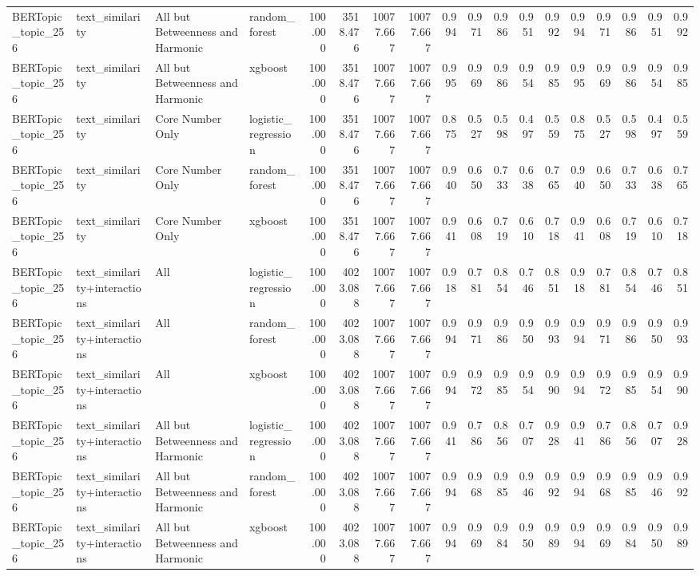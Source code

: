 \begin{tabular}{llllrrrrrrrrrrrrrr}
BERTopic_topic_256 & text_similarity & All but Betweenness and Harmonic & random_forest & 100.000 & 3518.476 & 10077.667 & 10077.667 & 0.994 & 0.971 & 0.986 & 0.951 & 0.992 & 0.994 & 0.971 & 0.986 & 0.951 & 0.992 \\
BERTopic_topic_256 & text_similarity & All but Betweenness and Harmonic & xgboost & 100.000 & 3518.476 & 10077.667 & 10077.667 & 0.995 & 0.969 & 0.986 & 0.954 & 0.985 & 0.995 & 0.969 & 0.986 & 0.954 & 0.985 \\
BERTopic_topic_256 & text_similarity & Core Number Only & logistic_regression & 100.000 & 3518.476 & 10077.667 & 10077.667 & 0.875 & 0.527 & 0.598 & 0.497 & 0.559 & 0.875 & 0.527 & 0.598 & 0.497 & 0.559 \\
BERTopic_topic_256 & text_similarity & Core Number Only & random_forest & 100.000 & 3518.476 & 10077.667 & 10077.667 & 0.940 & 0.650 & 0.733 & 0.638 & 0.765 & 0.940 & 0.650 & 0.733 & 0.638 & 0.765 \\
BERTopic_topic_256 & text_similarity & Core Number Only & xgboost & 100.000 & 3518.476 & 10077.667 & 10077.667 & 0.941 & 0.608 & 0.719 & 0.610 & 0.718 & 0.941 & 0.608 & 0.719 & 0.610 & 0.718 \\
BERTopic_topic_256 & text_similarity+interactions & All & logistic_regression & 100.000 & 4023.088 & 10077.667 & 10077.667 & 0.918 & 0.781 & 0.854 & 0.746 & 0.851 & 0.918 & 0.781 & 0.854 & 0.746 & 0.851 \\
BERTopic_topic_256 & text_similarity+interactions & All & random_forest & 100.000 & 4023.088 & 10077.667 & 10077.667 & 0.994 & 0.971 & 0.986 & 0.950 & 0.993 & 0.994 & 0.971 & 0.986 & 0.950 & 0.993 \\
BERTopic_topic_256 & text_similarity+interactions & All & xgboost & 100.000 & 4023.088 & 10077.667 & 10077.667 & 0.994 & 0.972 & 0.985 & 0.954 & 0.990 & 0.994 & 0.972 & 0.985 & 0.954 & 0.990 \\
BERTopic_topic_256 & text_similarity+interactions & All but Betweenness and Harmonic & logistic_regression & 100.000 & 4023.088 & 10077.667 & 10077.667 & 0.941 & 0.786 & 0.856 & 0.707 & 0.928 & 0.941 & 0.786 & 0.856 & 0.707 & 0.928 \\
BERTopic_topic_256 & text_similarity+interactions & All but Betweenness and Harmonic & random_forest & 100.000 & 4023.088 & 10077.667 & 10077.667 & 0.994 & 0.968 & 0.985 & 0.946 & 0.992 & 0.994 & 0.968 & 0.985 & 0.946 & 0.992 \\
BERTopic_topic_256 & text_similarity+interactions & All but Betweenness and Harmonic & xgboost & 100.000 & 4023.088 & 10077.667 & 10077.667 & 0.994 & 0.969 & 0.984 & 0.950 & 0.989 & 0.994 & 0.969 & 0.984 & 0.950 & 0.989 \\

\end{tabular}
